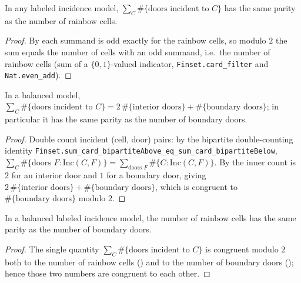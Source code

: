 \begin{lemma}
    \label{lem:door-count-rainbow-parity}
    \leanok
    In any labeled incidence model, $\sum_{C} \#\{\text{doors incident to } C\}$
    has the same parity as the number of rainbow cells.
\end{lemma}
\begin{proof}
    By  each summand is odd exactly for the rainbow
    cells, so modulo $2$ the sum equals the number of cells with an odd summand,
    i.e.\ the number of rainbow cells (sum of a $\{0,1\}$-valued indicator,
    \texttt{Finset.card\_filter} and \texttt{Nat.even\_add}).
\end{proof}

\begin{lemma}
    \label{lem:door-count-incidence}
    \leanok
    In a balanced model,
    $\sum_{C} \#\{\text{doors incident to } C\}
       = 2\,\#\{\text{interior doors}\} + \#\{\text{boundary doors}\}$;
    in particular it has the same parity as the number of boundary doors.
\end{lemma}
\begin{proof}
    Double count incident (cell, door) pairs: by the bipartite double-counting
    identity \texttt{Finset.sum\_card\_bipartiteAbove\_eq\_sum\_card\_bipartiteBelow},
    $\sum_{C} \#\{\text{doors } F : \mathrm{Inc}(C,F)\}
       = \sum_{\text{doors } F} \#\{C : \mathrm{Inc}(C,F)\}$.
    By  the inner count is $2$ for an interior door and
    $1$ for a boundary door, giving
    $2\,\#\{\text{interior doors}\} + \#\{\text{boundary doors}\}$, which is
    congruent to $\#\{\text{boundary doors}\}$ modulo $2$.
\end{proof}

\begin{lemma}
    \label{lem:sperner-parity}
    \leanok
    In a balanced labeled incidence model, the number of rainbow cells has the
    same parity as the number of boundary doors.
\end{lemma}
\begin{proof}
    The single quantity $\sum_{C} \#\{\text{doors incident to } C\}$ is congruent
    modulo $2$ both to the number of rainbow cells
    () and to the number of boundary doors
    (); hence those two numbers are congruent to
    each other.
\end{proof}

